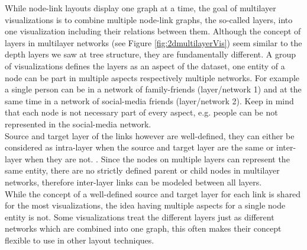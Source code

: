 While node-link layouts display one graph at a time, the goal of multilayer visualizations \label{exp:multilayer} is to combine multiple node-link graphs, the so-called layers, into one visualization including their relations between them. Although the concept of layers in multilayer networks (see Figure \ref{fig:2dmultilayerVis}) seem similar to the depth layers we saw at tree structure, they are fundamentally different. A group of visualizations defines the layers as an aspect of the dataset, one entity of a node can be part in multiple aspects respectively multiple networks. For example a single person can be in a network of family-friends (layer/network 1) and at the same time in a network of social-media friends (layer/network 2). Keep in mind that each node is not necessary part of every aspect, e.g. people can be not represented in the social-media network.\\
Source and target layer of the links however are well-defined, they can either be considered as intra-layer when the source and target layer are the same or inter-layer when they are not. \cite{ghoniem_state_2019}. Since the nodes on multiple layers can represent the same entity, there are no strictly defined parent or child nodes in multilayer networks, therefore inter-layer links can be modeled between all layers.\\
While the concept of a well-defined source and target layer for each link is shared for the most visualizations, the idea having multiple aspects for a single node entity is not. Some visualizations treat the different layers just as different networks which are combined into one graph, this often makes their concept flexible to use in other layout techniques. 


